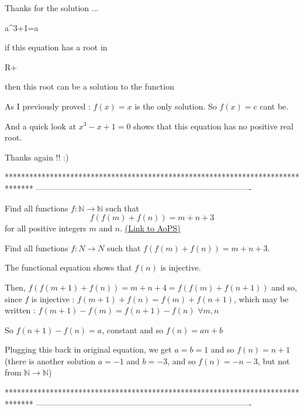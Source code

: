 \begin{solution}
	\begin{tcolorbox}Thanks for the solution ... 
\begin{bolded}a^{3}+1=a \end{bolded} if this equation has a root in \begin{bolded}{R+} \end{bolded} then this root can be a solution to the function\end{tcolorbox}
As I previously proved : $ f(x)=x$ is the only solution. So $ f(x)=c$ cant be.

And a quick look at $ x^3-x+1=0$ shows that this equation has no positive real root.
\end{solution}



\begin{solution}
	Thanks again !!  :)
\end{solution}
*******************************************************************************
-------------------------------------------------------------------------------

\begin{problem}
	Find all functions $f: \mathbb N \to \mathbb N$ such that \[ f(f(m) + f(n)) = m + n + 3\] for all positive integers $m$ and $n$.
	\flushright \href{https://artofproblemsolving.com/community/c6h318344}{(Link to AoPS)}
\end{problem}



\begin{solution}
	\begin{tcolorbox}Find all functions  $ f: N \to N$  such that  $ f(f(m) + f(n)) = m + n + 3$.\end{tcolorbox}

The functional equation shows that $ f(n)$ is injective.

Then, $ f(f(m + 1) + f(n)) = m + n + 4 = f(f(m) + f(n + 1))$ and so, since $ f$ is injective : $ f(m + 1) + f(n) = f(m) + f(n + 1)$, which may be written :
$ f(m + 1) - f(m) = f(n + 1) - f(n)$ $ \forall m,n$

So $ f(n + 1) - f(n) = a$, constant and so $ f(n) = an + b$

Plugging this back in original equation, we get $ a = b = 1$ and so $ \boxed{f(n) = n + 1}$ 
(there is another solution $ a = - 1$ and $ b = - 3$, and so $ f(n) = - n - 3$, but not from $ \mathbb N\to\mathbb N$)
\end{solution}
*******************************************************************************
-------------------------------------------------------------------------------

